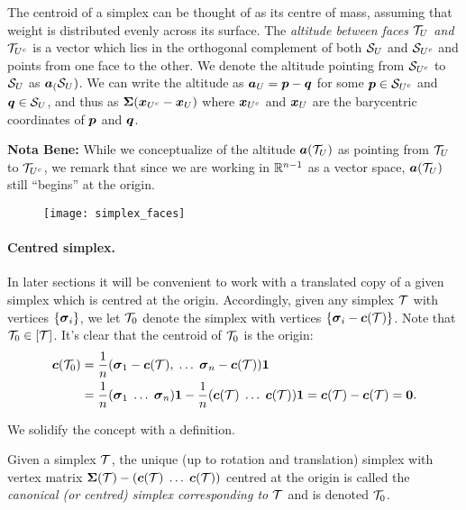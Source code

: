 The centroid of a simplex can be thought of as its centre of mass, assuming that weight is distributed evenly across its surface. The \emph{altitude between faces $\mathcal{T}_U$ and $\mathcal{T}_{U^c}$} is a vector which lies in the orthogonal complement of both $\mathcal{S}_U$ and $\mathcal{S}_{U^c}$ and points from one face to the other. 
We denote the altitude pointing from $\mathcal{S}_{U^c}$ to $\mathcal{S}_{U}$ as $\vb*{a}_(\mathcal{S}_U)$. We can write the altitude as $\vb*{a}_U=\vb*{p}-\vb*{q}$ for some $\vb*{p}\in \mathcal{S}_{U^c}$ and $\vb*{q}\in\mathcal{S}_{U}$, and thus as $\boldsymbol{\Sigma}(\vb*{x}_{U^c}-\vb*{x}_{U})$ where $\vb*{x}_{U^c}$ and $\vb*{x}_{U}$ are the barycentric coordinates of $\vb*{p}$ and $\vb*{q}$. 

\textbf{Nota Bene:} While  we conceptualize of the altitude $\vb*{a}(\mathcal{T}_U)$ as pointing from $\mathcal{T}_U$  to  $\mathcal{T}_{U^c}$, we  remark that since we are working in  $\mathbb{R}^{n-1}$  as  a vector  space,  $\vb*{a}(\mathcal{T}_U)$ still ``begins'' at  the origin. 

\begin{figure}
	\centering
	\texttt{[image: simplex\_faces]}
	\caption{}
	\label{fig:simplex_faces}
\end{figure}

\paragraph{Centred  simplex.}
In later sections it will be convenient to work with a translated copy of a given simplex which is centred at the origin. Accordingly, given any simplex $\mathcal{T}$ with vertices $\{\vb*{\sigma}_i\}$, we let $\mathcal{T}_0$ denote the simplex with vertices $\{\vb*{\sigma}_i - \vb*{c}(\mathcal{T})\}$. Note that $\mathcal{T}_0\in[\mathcal{T}]$. It's clear that the centroid of $\mathcal{T}_0$ is the origin: 
\begin{align*}
\vb*{c}(\mathcal{T}_0) 
&= \frac{1}{n}(\vb*{\sigma}_1-\vb*{c}(\mathcal{T}),\;\dots\;\vb*{\sigma}_n-\vb*{c}(\mathcal{T}))\vb{1} \\
&= \frac{1}{n}(\vb*{\sigma}_1\;\dots\;\vb*{\sigma}_n)\vb{1} - \frac{1}{n}(\vb*{c}(\mathcal{T})\;\dots\;\vb*{c}(\mathcal{T}))\vb{1} = \vb*{c}(\mathcal{T}) - \vb*{c}(\mathcal{T})=\vb{0}.
\end{align*}

We solidify the concept with a definition. 

\begin{definition}
	\label{def:centred_simplex}
	Given a simplex $\mathcal{T}$, the unique (up to rotation and translation) simplex with vertex matrix $\boldsymbol{\Sigma}(\mathcal{T}) - (\vb*{c}(\mathcal{T})\;\dots\;\vb*{c}(\mathcal{T}))$ centred at the origin is called the \emph{canonical (or centred) simplex corresponding to $\mathcal{T}$} and is denoted $\mathcal{T}_0$. 
\end{definition}

